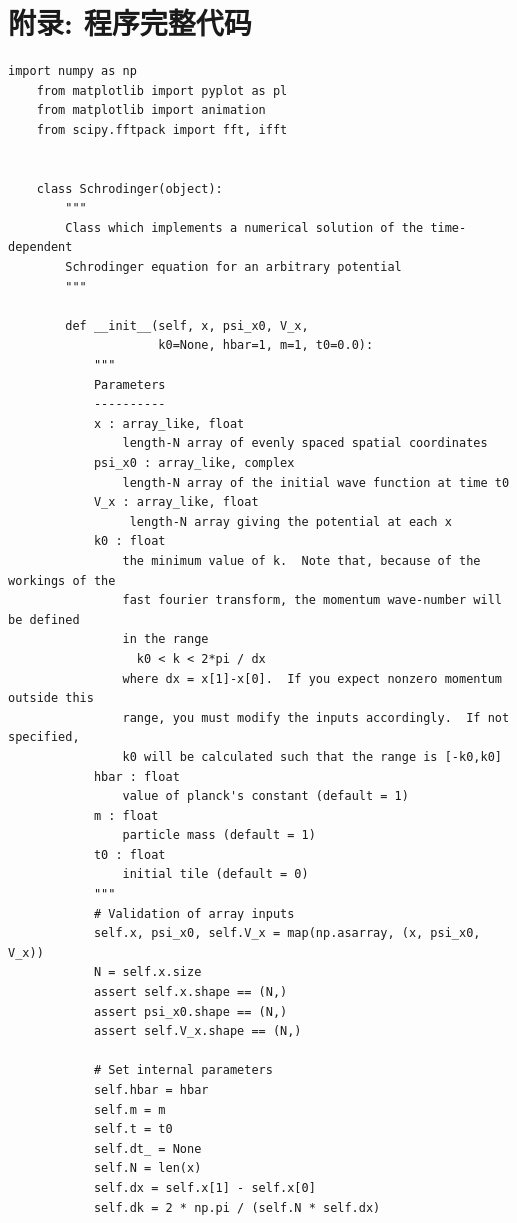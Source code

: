 \documentclass[UTF8,ctexart,a4paper,11pt,openany]{article}
\theoremstyle{definition}
\begin{document}
\section{附录: 程序完整代码}

\begin{lstlisting}[aboveskip=0pt]
    import numpy as np
    from matplotlib import pyplot as pl
    from matplotlib import animation
    from scipy.fftpack import fft, ifft
    
    
    class Schrodinger(object):
        """
        Class which implements a numerical solution of the time-dependent
        Schrodinger equation for an arbitrary potential
        """
    
        def __init__(self, x, psi_x0, V_x,
                     k0=None, hbar=1, m=1, t0=0.0):
            """
            Parameters
            ----------
            x : array_like, float
                length-N array of evenly spaced spatial coordinates
            psi_x0 : array_like, complex
                length-N array of the initial wave function at time t0
            V_x : array_like, float
                 length-N array giving the potential at each x
            k0 : float
                the minimum value of k.  Note that, because of the workings of the
                fast fourier transform, the momentum wave-number will be defined
                in the range
                  k0 < k < 2*pi / dx
                where dx = x[1]-x[0].  If you expect nonzero momentum outside this
                range, you must modify the inputs accordingly.  If not specified,
                k0 will be calculated such that the range is [-k0,k0]
            hbar : float
                value of planck's constant (default = 1)
            m : float
                particle mass (default = 1)
            t0 : float
                initial tile (default = 0)
            """
            # Validation of array inputs
            self.x, psi_x0, self.V_x = map(np.asarray, (x, psi_x0, V_x))
            N = self.x.size
            assert self.x.shape == (N,)
            assert psi_x0.shape == (N,)
            assert self.V_x.shape == (N,)
    
            # Set internal parameters
            self.hbar = hbar
            self.m = m
            self.t = t0
            self.dt_ = None
            self.N = len(x)
            self.dx = self.x[1] - self.x[0]
            self.dk = 2 * np.pi / (self.N * self.dx)
    

\end{lstlisting}
\end{document}
